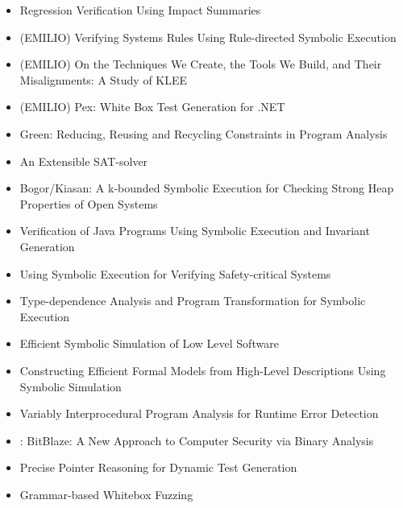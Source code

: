 \documentclass[10pt, a4paper]{article}
\begin{document}
\begin{itemize}
  \item \cite{BPR-SPIN13} Regression Verification Using Impact Summaries
  \item (EMILIO) \cite{CHW-ASPLOS13} Verifying Systems Rules Using Rule-directed Symbolic Execution
  \item \cite{RED-ICSE16} (EMILIO) On the Techniques We Create, the Tools We Build, and Their Misalignments: A Study of KLEE
  \item (EMILIO) \cite{PEX-TAP08} Pex: White Box Test Generation for .NET
  \item \cite{VGD-FSE12} Green: Reducing, Reusing and Recycling Constraints in Program Analysis
  \item \cite{ES-SAT03} An Extensible SAT-solver
  \item \cite{DL-ASE06} Bogor/Kiasan: A k-bounded Symbolic Execution for Checking Strong Heap Properties of Open Systems
  \item \cite{PV-SPIN04} Verification of Java Programs Using Symbolic Execution and Invariant Generation
  \item \cite{PDG-FSE01} Using Symbolic Execution for Verifying Safety-critical Systems
  \item \cite{AOH-TACAS07} Type-dependence Analysis and Program Transformation for Symbolic Execution
  \item \cite{AEO-DATE08} Efficient Symbolic Simulation of Low Level Software
  \item \cite{KP-JPP05} Constructing Efficient Formal Models from High-Level Descriptions Using Symbolic Simulation
  \item \cite{TBV-ISSTA07} Variably Interprocedural Program Analysis for Runtime Error Detection
  \item \cite{BITBLAZE-ICISS08}: {BitBlaze}: A New Approach to Computer Security via Binary Analysis 
  \item \cite{EGL-ISSTA09} Precise Pointer Reasoning for Dynamic Test Generation
  \item \cite{GKL-PLDI08} Grammar-based Whitebox Fuzzing
\end{itemize}
\end{document}
